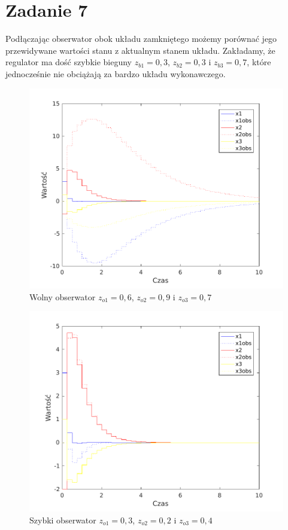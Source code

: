 \section{Zadanie 7} 
Podłączając obserwator obok układu zamkniętego możemy porównać jego przewidywane wartości stanu z aktualnym stanem układu.
Zakładamy, że regulator ma dość szybkie bieguny $z_{b1}=0,3$, $z_{b2}=0,3$ i $z_{b3}=0,7$, które jednocześnie nie obciążają za bardzo układu wykonawczego.

\begin{figure}[H]
\centering
 \includegraphics[width=\textwidth]{img/obs1.pdf}
\caption{Wolny obserwator $z_{o1}=0,6$, $z_{o2}=0,9$ i $z_{o3}=0,7$}
\end{figure}

\begin{figure}[H]
\centering
 \includegraphics[width=\textwidth]{img/obs2.pdf}
\caption{Szybki obserwator $z_{o1}=0,3$, $z_{o2}=0,2$ i $z_{o3}=0,4$}
\end{figure}

